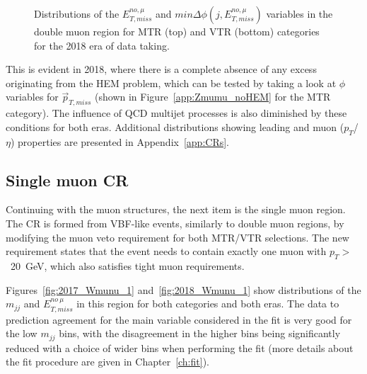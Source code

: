 \begin{figure}[htbp]
{    }
  \caption{Distributions of the $E_{T,miss}^{no,\mu}$ and $min\Delta\phi(j,E_{T,miss}^{no,\mu})$ variables in the double muon region for MTR (top) and VTR (bottom) categories for the 2018 era of data taking.}
  \label{fig:2018_Zmumu_2}
\end{figure}
\hspace{10pt} This is evident in 2018, where there is a complete absence of any excess originating from the HEM problem, which can be tested by taking a look at $\phi$ variables for $\vec{p}_{T, miss}$ (shown in Figure~\ref{app:Zmumu_noHEM} for the MTR category). The influence of QCD multijet processes is also diminished by these conditions for both eras. Additional distributions showing leading and muon ($p_T$/$\eta$) properties are presented in Appendix~\ref{app:CRs}.

\subsection{Single muon CR}
\label{sec:single_muon}
\hspace{10pt} Continuing with the muon structures, the next item is the single muon region. The CR is formed from VBF-like events, similarly to double muon regions, by modifying the muon veto requirement for both MTR/VTR selections. The new requirement states that the event needs to contain exactly one muon with $p_T>$~20~GeV, which also satisfies tight muon requirements.

\hspace{10pt} Figures~\ref{fig:2017_Wmunu_1} and~\ref{fig:2018_Wmunu_1} show distributions of the $m_{jj}$ and $E_{T,miss}^{no~\mu}$ in this region for both categories and both eras. The data to prediction agreement for the main variable considered in the fit is very good for the low $m_{jj}$ bins, with the disagreement in the higher bins being significantly reduced with a choice of wider bins when performing the fit (more details about the fit procedure are given in Chapter~\ref{ch:fit}).

